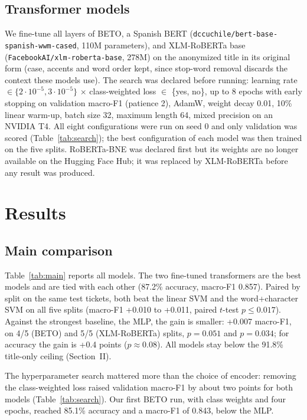\documentclass[conference]{IEEEtran}
\begin{document}
\subsection{Transformer models}
We fine-tune all layers of BETO, a Spanish BERT \cite{canete2020,devlin2019}
(\texttt{dccuchile/bert-base-spanish-wwm-cased}, 110M parameters), and XLM-RoBERTa base \cite{conneau2020}
(\texttt{FacebookAI/xlm-roberta-base}, 278M) on the anonymized title in its original form (case, accents and
word order kept, since stop-word removal discards the context these models use). The search was declared
before running: learning rate $\in\{2\cdot10^{-5}, 3\cdot10^{-5}\}$ $\times$ class-weighted loss $\in$ \{yes,
no\}, up to 8 epochs with early stopping on validation macro-F1 (patience 2), AdamW, weight decay 0.01,
10\% linear warm-up, batch size 32, maximum length 64, mixed precision on an NVIDIA T4. All eight configurations
were run on seed 0 and only validation was scored (Table~\ref{tab:search}); the best configuration of each model
was then trained on the five splits. RoBERTa-BNE was declared first but its weights are no longer available on
the Hugging Face Hub; it was replaced by XLM-RoBERTa before any result was produced.

\section{Results}

\subsection{Main comparison}


Table~\ref{tab:main} reports all models. The two fine-tuned transformers are the best models and are tied
with each other (87.2\% accuracy, macro-F1 0.857). Paired by split on the same test tickets, both beat the
linear SVM and the word+character SVM on all five splits (macro-F1 +0.010 to +0.011, paired $t$-test
$p \le 0.017$). Against the strongest baseline, the MLP, the gain is smaller: +0.007 macro-F1, on 4/5 (BETO)
and 5/5 (XLM-RoBERTa) splits, $p=0.051$ and $p=0.034$; for accuracy the gain is +0.4 points ($p\approx0.08$).
All models stay below the 91.8\% title-only ceiling (Section~II).

The hyperparameter search mattered more than the choice of encoder: removing the class-weighted loss raised
validation macro-F1 by about two points for both models (Table~\ref{tab:search}). Our first BETO run, with
class weights and four epochs, reached 85.1\% accuracy and a macro-F1 of 0.843, below the MLP.
\end{document}
